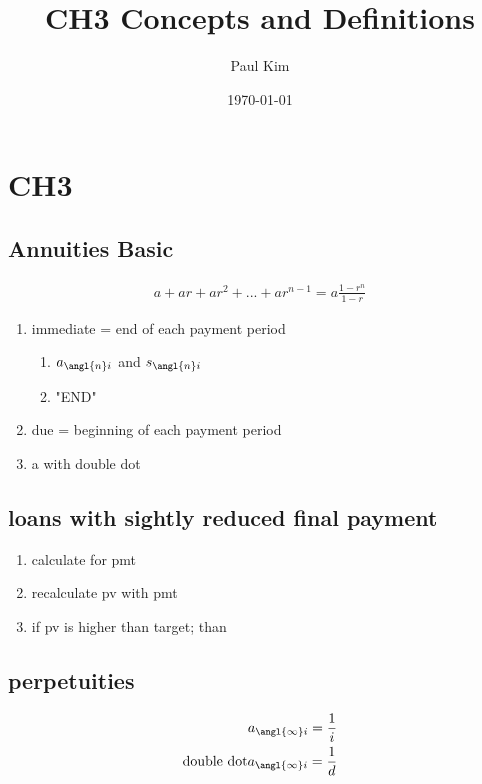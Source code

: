 \documentclass[12pt]{article}
\begin{document}
	
\title{CH3 Concepts and Definitions}
\author{Paul Kim}
\date{\today}
\maketitle

\section{CH3}
\subsection{Annuities Basic}
\begin{align}
	a + ar + ar^2 + ... + ar^{n-1} = a \frac{1-r^n}{1 - r} \nonumber
\end{align}
\begin{enumerate}
	\item immediate = end of each payment period
	\begin{enumerate}
		\item $a_{\angl{n}i}$ and $s_{\angl{n}i}$
		\item "END"
	\end{enumerate}

	\item due = beginning of each payment period
	\item a with double dot
\end{enumerate}

\subsection{loans with sightly reduced final payment}
\begin{enumerate}
	\item calculate for pmt
	\item recalculate pv with pmt
	\item if pv is higher than target; than 
\end{enumerate}
\subsection{perpetuities}
\begin{align}
	a_{\angl{\infty}i} = \frac{1}{i} \nonumber \\
	 \text{double dot} a_{\angl{\infty}i} = \frac{1}{d} \nonumber
\end{align}
\end{document}
